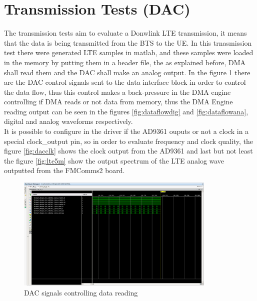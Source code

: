 \vfill
\clearpage

\section{Transmission Tests (DAC)}
\label{result:dac}

 The transmission tests aim to evaluate a Donwlink LTE transmission, it means
that the data is being transmitted from the BTS to the UE. In this trnasmission
test there were generated LTE samples in matlab, and these samples were loaded
in the memory by putting them in a header file, the as explained before, DMA
shall read them and the DAC shall make an analog output. In the figure
\ref{fig:dacsignals} there are the DAC control signals sent to the data
interface block in order to control the data flow, thus this control makes a
back-pressure in the DMA engine controlling if DMA reads or not data from
memory, thus the DMA Engine reading output can be seen in the figures
\ref{fig:dataflowdig} and \ref{fig:dataflowana}, digital and analog waveforms
respectively.\\

 It is possible to configure in the driver if the AD9361 ouputs or not a clock
in a special clock\_output pin, so in order to evaluate frequency and clock
quality, the figure \ref{fig:dacclk} shows the clock output from the AD9361 and
last but not least the figure \ref{fig:lte5m} show the output spectrum of the
LTE analog wave outputted from the FMComms2 board.

\begin{figure}[htbp]
    \centering
    \includegraphics[width=0.85\textwidth]{./figures/dac_signals}
    \caption{ DAC signals controlling data reading
    \label{fig:dacsignals}}
\end{figure}

